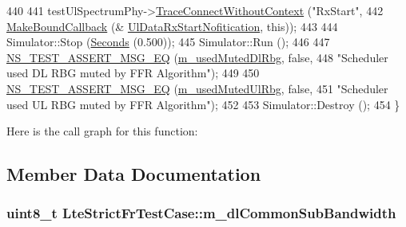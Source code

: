 \begin{DoxyCode}
440 
441   testUlSpectrumPhy->\hyperlink{classns3_1_1ObjectBase_a1be45f6fd561e75dcac9dfa81b2b81e4}{TraceConnectWithoutContext} (\textcolor{stringliteral}{"RxStart"},
442                                                  \hyperlink{group__makeboundcallback_ga1725d6362e6065faa0709f7c93f8d770}{MakeBoundCallback} (&
      \hyperlink{lte-test-frequency-reuse_8cc_ae8691768e5cb30db2389ac11752ce7b3}{UlDataRxStartNofitication}, \textcolor{keyword}{this}));
443 
444   Simulator::Stop (\hyperlink{group__timecivil_ga33c34b816f8ff6628e33d5c8e9713b9e}{Seconds} (0.500));
445   Simulator::Run ();
446 
447   \hyperlink{group__testing_ga2a9d78cffb3db8e867c35fff0b698cf5}{NS\_TEST\_ASSERT\_MSG\_EQ} (\hyperlink{classLteFrTestCase_a57b4d14dd22adfb64572dce3602703e2}{m\_usedMutedDlRbg}, \textcolor{keyword}{false},
448                          \textcolor{stringliteral}{"Scheduler used DL RBG muted by FFR Algorithm"});
449 
450   \hyperlink{group__testing_ga2a9d78cffb3db8e867c35fff0b698cf5}{NS\_TEST\_ASSERT\_MSG\_EQ} (\hyperlink{classLteFrTestCase_ae54b6fb11ce52cc697928f18f6a4e6c2}{m\_usedMutedUlRbg}, \textcolor{keyword}{false},
451                          \textcolor{stringliteral}{"Scheduler used UL RBG muted by FFR Algorithm"});
452 
453   Simulator::Destroy ();
454 \}
\end{DoxyCode}


Here is the call graph for this function\+:




\subsection{Member Data Documentation}
\subsubsection[{\texorpdfstring{m\+\_\+dl\+Common\+Sub\+Bandwidth}{m_dlCommonSubBandwidth}}]{\setlength{\rightskip}{0pt plus 5cm}uint8\+\_\+t Lte\+Strict\+Fr\+Test\+Case\+::m\+\_\+dl\+Common\+Sub\+Bandwidth\hspace{0.3cm}{\ttfamily [private]}}\hypertarget{classLteStrictFrTestCase_ade1216e9161be5712e6c7e9101589179}{}\label{classLteStrictFrTestCase_ade1216e9161be5712e6c7e9101589179}
